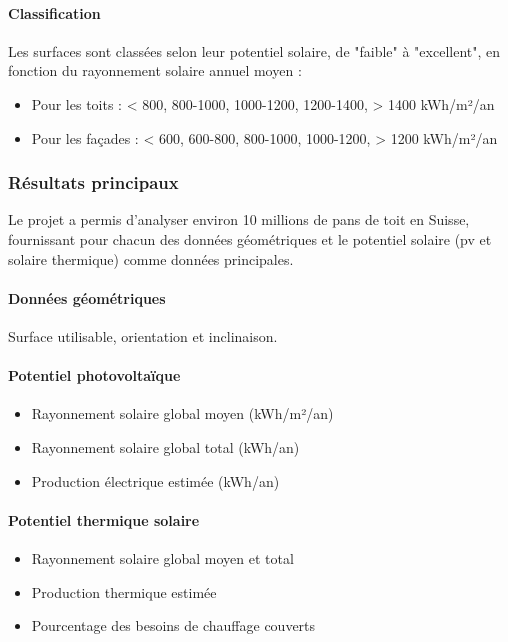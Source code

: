 \paragraph{Classification}
\par{Les surfaces sont classées selon leur potentiel solaire, de "faible" à "excellent", en fonction du rayonnement solaire annuel moyen :}
\begin{itemize}
    \item Pour les toits : < 800, 800-1000, 1000-1200, 1200-1400, > 1400 kWh/m²/an
    \item Pour les façades : < 600, 600-800, 800-1000, 1000-1200, > 1200 kWh/m²/an
\end{itemize}

\subsubsection{Résultats principaux}
\par{Le projet a permis d'analyser environ 10 millions de pans de toit en Suisse, fournissant pour chacun des données géométriques et le potentiel solaire (\acrshort{pv} et solaire thermique) comme données principales.}
\paragraph{Données géométriques} Surface utilisable, orientation et inclinaison.
\paragraph{Potentiel photovoltaïque}
\begin{itemize}
    \item Rayonnement solaire global moyen (kWh/m²/an)
    \item Rayonnement solaire global total (kWh/an)
    \item Production électrique estimée (kWh/an)
\end{itemize}
\paragraph{Potentiel thermique solaire}
\begin{itemize}
    \item Rayonnement solaire global moyen et total
    \item Production thermique estimée
    \item Pourcentage des besoins de chauffage couverts
\end{itemize}
